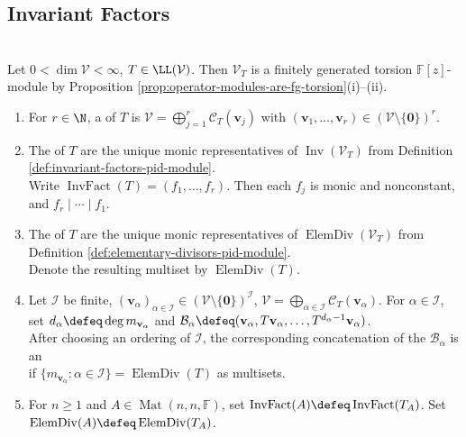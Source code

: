 \subsection{Invariant Factors}

\begin{definition} \label{def:operator-invariant-factors-elementary-divisors} \\
Let $0<\dim\mathcal{V}<\infty$, $T\in\LL(\mathcal{V})$. Then $\mathcal{V}_T$ is a finitely generated torsion $\mathbb{F}[z]$-module by Proposition \ref{prop:operator-modules-are-fg-torsion}(i)--(ii).
\begin{enumerate}[label=(\roman*)]
\setlength{\itemsep}{0pt}
\item For $r\in\N$, a  of $T$ is $\mathcal{V}=\bigoplus\limits_{j=1}^r\mathcal{C}_T(\mathbf{v}_j)$ with $(\mathbf{v}_1,\ldots,\mathbf{v}_r)\in(\mathcal{V}\setminus\{\mathbf{0}\})^r$.
\item The  of $T$ are the unique monic representatives of $\operatorname{Inv}(\mathcal{V}_T)$ from Definition \ref{def:invariant-factors-pid-module}.\\
Write $\operatorname{InvFact}(T)=(f_1,\ldots,f_r)$. Then each $f_j$ is monic and nonconstant, and $f_r\mid\cdots\mid f_1$.
\item The  of $T$ are the unique monic representatives of $\operatorname{ElemDiv}(\mathcal{V}_T)$ from Definition \ref{def:elementary-divisors-pid-module}.\\
Denote the resulting multiset by $\operatorname{ElemDiv}(T)$.
\item Let $\mathcal{I}$ be finite, $(\mathbf{v}_{\alpha})_{\alpha\in\mathcal{I}}\in(\mathcal{V}\setminus\{\mathbf{0}\})^{\mathcal{I}}$, $\mathcal{V}=\bigoplus\limits_{\alpha\in\mathcal{I}}\mathcal{C}_T(\mathbf{v}_{\alpha})$. For $\alpha\in\mathcal{I}$, set $d_{\alpha}\defeq\deg m_{\mathbf{v}_{\alpha}}$ and $\mathcal{B}_{\alpha}\defeq(\mathbf{v}_{\alpha},T\mathbf{v}_{\alpha},\ldots,T^{d_{\alpha}-1}\mathbf{v}_{\alpha})$.\\
After choosing an ordering of $\mathcal{I}$, the corresponding concatenation of the $\mathcal{B}_{\alpha}$ is an \\
if $\{m_{\mathbf{v}_{\alpha}}:\alpha\in\mathcal{I}\}=\operatorname{ElemDiv}(T)$ as multisets.
\item For $n\geq1$ and $A\in\operatorname{Mat}(n,n,\mathbb{F})$, set $\operatorname{InvFact}(A)\defeq\operatorname{InvFact}(T_A)$. Set $\operatorname{ElemDiv}(A)\defeq\operatorname{ElemDiv}(T_A)$.
\end{enumerate}
\end{definition}

